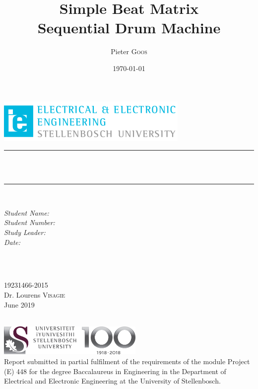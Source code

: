 \documentclass[12pt,a4paper]{report}
\title{Simple Beat Matrix \\ Sequential Drum Machine } %
\author{Pieter \textsc{Goos}} %
\date{\today} %
\makeatletter
\let\thetitle\@title
\let\theauthor\@author
\makeatother
\begin{document}
\begin{titlepage}
    \centering
    \vspace*{0.5 cm}
    \includegraphics[scale = 2]{EELogo.png}\\[1.0 cm]   %
    \vspace{3cm}
    \rule{\linewidth}{0.2 mm} \\[0.4 cm]
    { \huge \bfseries \thetitle }\\[0.4 cm]
    \rule{\linewidth}{0.2 mm} \\[1.5 cm]
    \vspace{2cm}
	\begin{minipage}{6.5cm}
		\begin{flushleft} \large
			\emph{Student Name:}\\
			\emph{Student Number:}\\
			\emph{Study Leader:}\\
			\emph{Date:}
		\end{flushleft}
	\end{minipage}~
	\begin{minipage}{6.5cm}
		\begin{flushright} \large
		\theauthor\\
		19231466-2015\\
		Dr. Lourens \textsc{Visagie}\\
		June 2019
		\end{flushright}
	\end{minipage}\\[2 cm]
    \vfill
    \includegraphics[width=7cm]{SUNLogo.jpg}\\[1.0 cm]
    Report submitted in partial fulfilment of the requirements of the module Project (E) 448 for the degree Baccalaureus in Engineering in the Department of Electrical and Electronic Engineering at the University of Stellenbosch.
    
\end{titlepage}

\end{document}
